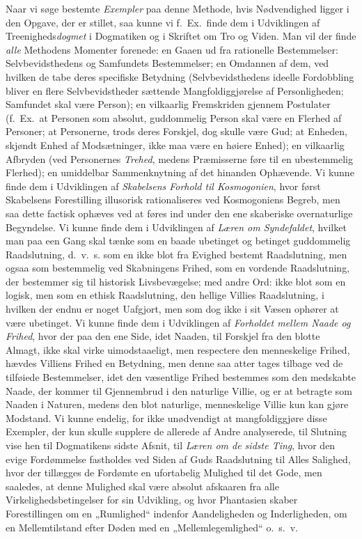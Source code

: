 \documentclass[12pt,a4paper]{book}
\newcommand{\opage}[1]{\marginnote{\footnotesize\textit{[#1]}}}
\begin{document}
Naar vi søge bestemte \emph{Exempler} paa denne Methode, hvis Nødvendighed ligger i den Opgave,
der er stillet, saa kunne vi f.\ Ex.\ finde dem i Udviklingen af Treenigheds\emph{dogmet} i
Dogmatiken og i Skriftet om Tro og Viden. Man vil der finde \emph{alle} Methodens Momenter
forenede: en Gaaen ud fra rationelle Bestemmelser: Selvbevidsthedens og Samfundets
Bestemmelser; en Omdannen af dem, ved hvilken de tabe deres specifiske Betydning
(Selvbevidsthedens \opage{111}ideelle Fordobbling bliver en flere Selvbevidstheder sættende
Mangfoldiggjørelse af Personligheden; Samfundet skal være Person); en vilkaarlig
Fremskriden gjennem Postulater (f.\ Ex.\ at Personen som absolut, guddommelig Person skal
være en Flerhed af Personer; at Personerne, trods deres Forskjel, dog skulle være Gud; at
Enheden, skjøndt Enhed af Modsætninger, ikke maa være en høiere Enhed); en vilkaarlig
Afbryden (ved Personernes \emph{Trehed}, medens Præmisserne føre til en ubestemmelig Flerhed); en
umiddelbar Sammenknytning af det hinanden Ophævende. Vi kunne finde dem i Udviklingen af \emph{Skabelsens Forhold til Kosmogonien}, hvor først Skabelsens Forestilling illusorisk
rationaliseres ved Kosmogoniens Begreb, men saa dette factisk ophæves ved at føres ind
under den ene skaberiske overnaturlige Begyndelse. Vi kunne finde dem i Udviklingen af \emph{Læren om Syndefaldet}, hvilket man paa een Gang skal tænke som en baade ubetinget og
betinget guddommelig Raadslutning, d.\ v.\ s. som en ikke blot fra Evighed bestemt
Raadslutning, men ogsaa som bestemmelig ved Skabningens Frihed, som en vordende
Raadslutning, der bestemmer sig til historisk Livsbevægelse; med andre Ord: ikke blot som
en logisk, men som en ethisk Raadslutning, den hellige Villies Raadslutning, i hvilken der
endnu er noget Uafgjort, men som dog ikke i sit Væsen ophører at være ubetinget. Vi kunne finde dem i Udviklingen af \emph{Forholdet mellem Naade og Frihed}, hvor der paa den ene
Side, idet Naaden, til Forskjel fra den blotte Almagt, ikke skal virke uimodstaaeligt, men
respectere den menneskelige Frihed, hævdes Villiens Frihed en Betydning, men denne saa
atter tages tilbage ved de tilføiede Bestemmelser, idet den væsentlige Frihed bestemmes som
den medskabte Naade, der kommer til Gjennembrud i den naturlige Villie, og er at betragte
som Naaden i Naturen, medens den blot naturlige, menneskelige Villie kun kan gjøre
Modstand. Vi kunne endelig, for ikke unødvendigt at mangfoldiggjøre disse Exempler, der kun
skulle supplere de allerede af Andre analyserede, til Slutning vise hen til Dogmati\opage{112}kens
sidste Afsnit, til \emph{Læren om de sidste Ting}, hvor den evige Fordømmelse fastholdes
ved Siden af Guds Raadslutning til Alles Salighed, hvor der tillægges de Fordømte en
ufortabelig Mulighed til det Gode, men saaledes, at denne Mulighed skal være absolut
afskaaren fra alle Virkelighedsbetingelser for sin Udvikling, og hvor Phantasien skaber
Forestillingen om en „Rumlighed“ indenfor Aandeligheden og Inderligheden, om en
Mellemtilstand efter Døden med en „Mellemlegemlighed“ o.\ s.\ v.
\end{document}
